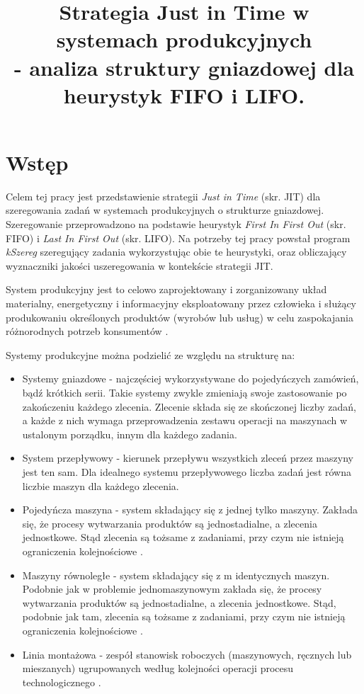 \documentclass[twoside]{kInzynierka}
\title{Strategia Just in Time w systemach produkcyjnych\\ - analiza struktury gniazdowej dla heurystyk FIFO i LIFO.}
\begin{document}
\section        {Wstęp}
Celem tej pracy jest przedstawienie strategii \emph{Just in Time} (skr. JIT) dla szeregowania zadań w systemach produkcyjnych o strukturze gniazdowej. Szeregowanie przeprowadzono na podstawie heurystyk \emph{First In First Out} (skr. FIFO) i \emph{Last In First Out} (skr. LIFO). Na potrzeby tej pracy powstał program \emph{kSzereg} szeregujący zadania wykorzystując obie te heurystyki, oraz obliczający wyznaczniki jakości uszeregowania w kontekście strategii JIT.

System produkcyjny jest to celowo zaprojektowany i zorganizowany układ materialny, energetyczny i informacyjny eksploatowany przez człowieka i służący produkowaniu określonych produktów (wyrobów lub usług) w celu zaspokajania różnorodnych potrzeb konsumentów \cite{pastuszak}.

Systemy produkcyjne można podzielić ze względu na strukturę na:

\begin{itemize}
\item Systemy gniazdowe - najczęściej wykorzystywane do pojedyńczych zamówień, bądź krótkich serii. Takie systemy zwykle zmieniają swoje zastosowanie po zakończeniu każdego zlecenia. Zlecenie składa się ze skończonej liczby zadań, a każde z nich wymaga przeprowadzenia zestawu operacji na maszynach w ustalonym porządku, innym dla każdego zadania.
\item System przepływowy - kierunek przepływu wszystkich zleceń przez maszyny jest ten sam. Dla idealnego systemu przepływowego liczba zadań jest równa liczbie maszyn dla każdego zlecenia. \cite{grzechca}
\item Pojedyńcza maszyna - system składający się z jednej tylko maszyny. Zakłada się, że procesy wytwarzania produktów są jednostadialne, a zlecenia jednostkowe. Stąd zlecenia są tożsame z zadaniami, przy czym nie istnieją ograniczenia kolejnościowe \cite{grzechca}.
\item Maszyny równoległe - system składający się z m identycznych maszyn. Podobnie jak w problemie jednomaszynowym zakłada się, że procesy wytwarzania produktów są jednostadialne, a zlecenia jednostkowe. Stąd, podobnie jak tam, zlecenia są tożsame z zadaniami, przy czym nie istnieją ograniczenia kolejnościowe \cite{grzechca}.
\item Linia montażowa -  zespół stanowisk roboczych (maszynowych, ręcznych lub mieszanych) ugrupowanych według kolejności operacji procesu technologicznego \cite{wiki}.
\end{itemize}
\end{document}
